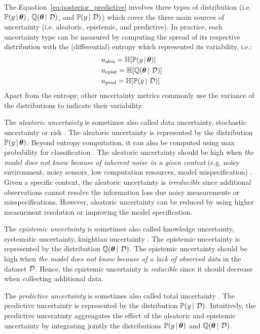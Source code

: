 The Equation~\ref{eq:posterior_predictive} involves three types of distribution (i.e. $\mathbb{P}(y \,|\, \bm{\theta})$, $\operatorname{\mathbb{Q}}(\bm{\theta} \,|\, \operatorname{\mathcal{D}})$, and $\mathbb{P}(y \,|\, \operatorname{\mathcal{D}})$) which cover the three main sources of uncertainty (i.e. aleatoric, epistemic, and predictive).
In practice, each uncertainty type can be measured by computing the spread of its respective distribution with the (differential) entropy which represented its variability, i.e.:
\begin{align}
    & u_\text{alea} = \operatorname{\mathbb{H}}[\mathbb{P}(y \,|\, \bm{\theta})]\\
    & u_\text{epist} = \operatorname{\mathbb{H}}[\operatorname{\mathbb{Q}}(\bm{\theta} \,|\, \operatorname{\mathcal{D}})]\\
    & u_\text{pred} = \operatorname{\mathbb{H}}[\mathbb{P}(y \,|\, \operatorname{\mathcal{D}})]
\end{align}
Apart from the entropy, other uncertainty metrics commonly use the variance of the distributions to indicate their variability.

The \emph{aleatoric uncertainty} is sometimes also called data uncertainty, stochastic uncertainty or risk . 
The aleatoric uncertainty is represented by the distribution $\mathbb{P}(y \,|\, \bm{\theta})$.
Beyond entropy computation, it can also be computed using max probability for classification \cite{malini2018}.
The aleatoric uncertainty should be high when \emph{the model does not know because of inherent noise in a given context} (e.g. noisy environment, noisy sensors, low computation resources, model mispecification) .
Given a specific context, the aleatoric uncertainty is \emph{irreducible} since additional observations cannot resolve the information loss due noisy measurements or misspecifications. 
However, aleatoric uncertainty can be reduced by using higher measurment resolution or improving the model specification. 

The \emph{epistemic uncertainty} is sometimes also called knowledge uncertainty, systematic uncertainty, knightian uncertainty  .
The epistemic uncertainty is represented by the distribution $\operatorname{\mathbb{Q}}(\bm{\theta} \,|\, \operatorname{\mathcal{D}})$.
The epistemic uncertainty should be high when \emph{the model does not know because of a lack of observed data} in the dataset $\operatorname{\mathcal{D}}$.
Hence, the epistemic uncertainty is \emph{reducible} since it should decrease when collecting additional data.

The \emph{predictive uncertainty} is sometimes also called total uncertainty .
The predictive uncertainty is represented by the distribution $\mathbb{P}(y \,|\, \operatorname{\mathcal{D}})$.
Intuitively, the predictive unceratinty aggreagates the effect of the aleatoric and epistemic uncertainty by integrating jointly the distributions $\mathbb{P}(y \,|\, \bm{\theta})$ and $\operatorname{\mathbb{Q}}(\bm{\theta} \,|\, \operatorname{\mathcal{D}})$.

